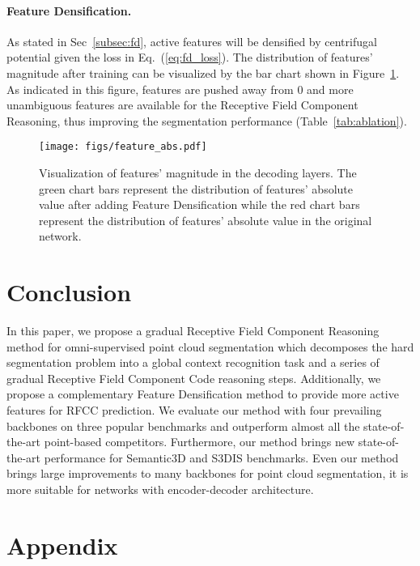 \documentclass[final]{cvpr}
\begin{document}
\paragraph{Feature Densification.}

As stated in Sec~\ref{subsec:fd}, active features will be densified by centrifugal potential given the loss in Eq.~(\ref{eq:fd_loss}). The distribution of features' magnitude after training can be visualized by the bar chart shown in Figure~\ref{fig:magnitude}. As indicated in this figure, features are pushed away from $0$ and more unambiguous features are available for the Receptive Field Component Reasoning, thus improving the segmentation performance (Table~\ref{tab:ablation}).

\begin{figure}[ht]
    \centering
    \texttt{[image: figs/feature\_abs.pdf]}
    \caption{Visualization of features' magnitude in the decoding layers. The green chart bars represent the distribution of features' absolute value after adding Feature Densification while the red chart bars represent the distribution of features' absolute value in the original network.}
    \label{fig:magnitude}
\end{figure}

\section{Conclusion}
In this paper, we propose a gradual Receptive Field Component Reasoning method for omni-supervised point cloud segmentation which decomposes the hard segmentation problem into a global context recognition task and a series of gradual Receptive Field Component Code reasoning steps. Additionally, we propose a complementary Feature Densification method to provide more active features for RFCC prediction. We evaluate our method with four prevailing backbones on three popular benchmarks and outperform almost all the state-of-the-art point-based competitors. Furthermore, our method brings new state-of-the-art performance for Semantic3D and S3DIS benchmarks. Even our method brings large improvements to many backbones for point cloud segmentation, it is more suitable for networks with encoder-decoder architecture.



{\small


}
\newpage
\appendix
\section*{Appendix}
\end{document}
